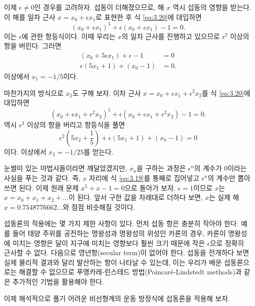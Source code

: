 \documentclass[chapter, oneside, b5paper]{oblivoir}
\theoremstyle{plain}
\theoremstyle{definition}
\theoremstyle{remark}
\begin{document}
이제 $\epsilon \neq 0$인 경우를 고려하자. 섭동이 더해졌으므로, 해 $x$ 역시 섭동의 영향을 받는다. 이 해를 일차 근사 $x=x_0+ \epsilon x_1$로 표현한 후 식 \ref{eq:3.20}에 대입하면
\begin{equation}
(x_0+\epsilon x_1)^5 + \epsilon (x_0 + \epsilon x_1)-1=0.
    \label{eq:3.21}
\end{equation}
이는 $\epsilon$에 관한 항등식이다. 이때 우리는 $x$의 일차 근사를 진행하고 있으므로 $\epsilon^2$ 이상의 항을 버린다. 그러면
\begin{equation}
\begin{aligned}
    (x_0 + 5 \epsilon x_1) + \epsilon - 1 &= 0 \\
    \epsilon (5x_1 + 1) + (x_0-1) &= 0.
\end{aligned}
\end{equation}
이상에서 $x_1 = -1/5$이다.

마찬가지의 방식으로 $x_2$도 구해 보자. 이차 근사 $x=x_0 + \epsilon x_1 + \epsilon^2 x_2$를 식 \ref{eq:3.20}에 대입하면
\begin{equation}
    (x_0 + \epsilon x_1 + \epsilon^2 x_2)^5 + \epsilon (x_0 + \epsilon x_1 + \epsilon^2 x_2)-1=0.
\end{equation}
역시 $\epsilon^3$ 이상의 항을 버리고 항등식을 풀면
\begin{equation}
    \epsilon^2(5x_2 + \frac{1}{5})+ \epsilon (5x_1 + 1) + (x_0-1) = 0
\end{equation}
이다. 이상에서 $x_2=-1/25$를 얻는다.

눈썰미 있는 마법사들이라면 깨달았겠지만, $x_n$을 구하는 과정은 $\epsilon^n$의 계수가 $0$이라는 사실을 푸는 것과 같다. 즉, $x$ 자리에 식 \ref{eq:3.19}를 통째로 집어넣고 $\epsilon^n$의 계수만 뽑아 쓰면 된다. 이제 원래 문제 $x^5+x-1=0$으로 돌아가 보자. $\epsilon=1$이므로 $x$는 $x=x_0+x_1+x_2+\dots$이 된다. 앞서 구한 값을 차례대로 더하다 보면, $x$는 실제 해 $x = 0.7548776662\dots$와 점점 비슷해질 것이다.

섭동론의 적용에는 몇 가지 제한 사항이 있다. 먼저 섭동 항은 충분히 작아야 한다. 예를 들어 태양 주위를 공전하는 명왕성과 명왕성의 위성인 카론의 경우, 카론이 명왕성에 미치는 영향은 달이 지구에 미치는 영향보다 훨씬 크기 때문에 작은 $\epsilon$으로 정확히 근사할 수 없다. 다음으로 영년항(secular term)이 없어야 한다. 섭동을 전개하다 보면 실제 물리적 결과와 달리 발산하는 항이 나타날 수 있는데, 이는 우리가 배운 섭동론으로는 해결할 수 없으므로 푸앵카레-린스테드 방법(Poincaré-Lindstedt methods)과 같은 추가적인 기법을 활용해야 한다.

이제 해석적으로 풀기 어려운 비선형계의 운동 방정식에 섭동론을 적용해 보자.
\end{document}
